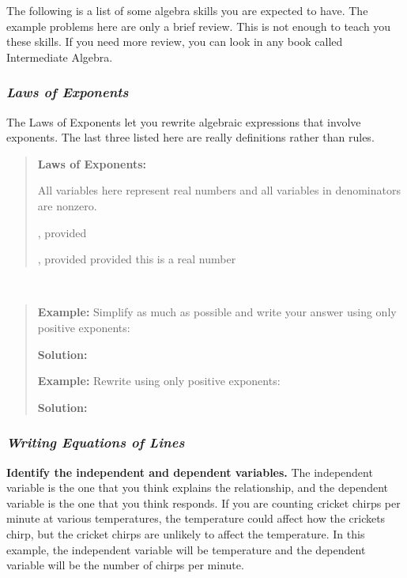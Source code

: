 The following is a list of some algebra skills you are expected to have.
The example problems here are only a brief review. This is not enough to
teach you these skills. If you need more review, you can look in any
book called Intermediate Algebra.

\subsubsection{\texorpdfstring{\emph{\textbf{Laws of
Exponents}}}{Laws of Exponents}}\label{laws-of-exponents}

The Laws of Exponents let you rewrite algebraic expressions that involve
exponents. The last three listed here are really definitions rather than
rules.

\begin{quote}
\textbf{Laws of Exponents: }

All variables here represent real numbers and all variables in
denominators are nonzero.

, provided

, provided provided this is a real number
\end{quote}

\textbf{\\
}

\begin{quote}
\textbf{Example:} Simplify as much as possible and write your answer
using only positive exponents:

\textbf{Solution:}

\textbf{Example:} Rewrite using only positive exponents:

\textbf{Solution:}
\end{quote}

\subsubsection{\texorpdfstring{\emph{\textbf{Writing Equations of
Lines}}}{Writing Equations of Lines}}\label{writing-equations-of-lines}

\textbf{Identify the independent and dependent variables.} The
independent variable is the one that you think explains the
relationship, and the dependent variable is the one that you think
responds. If you are counting cricket chirps per minute at various
temperatures, the temperature could affect how the crickets chirp, but
the cricket chirps are unlikely to affect the temperature. In this
example, the independent variable will be temperature and the dependent
variable will be the number of chirps per minute.

